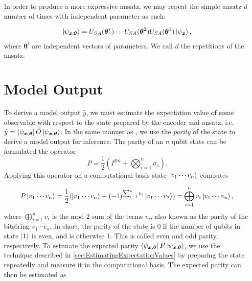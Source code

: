 In order to produce a more expressive ansatz, we may repeat the simple ansatz $d$ number of times with independent parameter as such:

\begin{equation}\label{eq:simple ansatz}
    \ket{\psi_{\boldsymbol{x}, \boldsymbol{\theta}}} = 
    U_{SA}(\boldsymbol{\theta}^r)\cdots U_{SA}(\boldsymbol{\theta}^2) U_{SA}(\boldsymbol{\theta}^1)\ket{\psi_{\boldsymbol{x}}},
\end{equation}
where $\boldsymbol{\theta}^i$ are independent vectors of parameters. We call $d$ the repetitions of the ansatz.

\section{Model Output}\label{sec:Inference}
To derive a model output $\hat{y}$, we must estimate the expectation value of some observable with respect to the state prepared by the encoder and ansatz, i.e. $\hat{y} =\bra{\psi_{\boldsymbol{x},\boldsymbol{\theta}}}
\hat{O} 
\ket{\psi_{\boldsymbol{x},\boldsymbol{\theta}}}$. In the same manner as \citet{abbas2020power}, we use the \emph{parity} of the state to derive a model output for inference. The parity of an $n$ qubit state can be formulated the operator
\begin{equation}\label{eq:parity}
    P = \frac{1}{2}(I^{\otimes n} + \bigotimes_{i=1}^n \sigma_z).
\end{equation}
Applying this operator on a computational basis state $\ket{v_1  \cdots v_n}$ computes 


\begin{equation}
    P\ket{v_1  \cdots v_n} = 
    \frac{1}{2}(\ket{v_1  \cdots v_n} -(-1)^{\sum_{i=1}^n v_i}\ket{v_1  \cdots v_2}) = 
    \bigoplus_{i=1}^n v_i \ket{v_1  \cdots v_n}, 
\end{equation}
where $\bigoplus_{i=1}^n v_i$ is the mod 2 sum of the terms $v_i$, also known as the parity of the bitstring $v_1\cdots v_n$. In short, the parity of the state is $0$ if the number of qubits in state $\ket{1}$ is even, and is otherwise 1. This is called even and odd parity, respectively. To estimate the expected parity $\bra{\psi_{\boldsymbol{x},\boldsymbol{\theta}}}P 
\ket{\psi_{\boldsymbol{x},\boldsymbol{\theta}}}$, we use the technique described in \cref{sec:EstimatingExpectationValues} by preparing the state repeatedly and measure it in the computational basis. The expected parity can then be estimated as 

